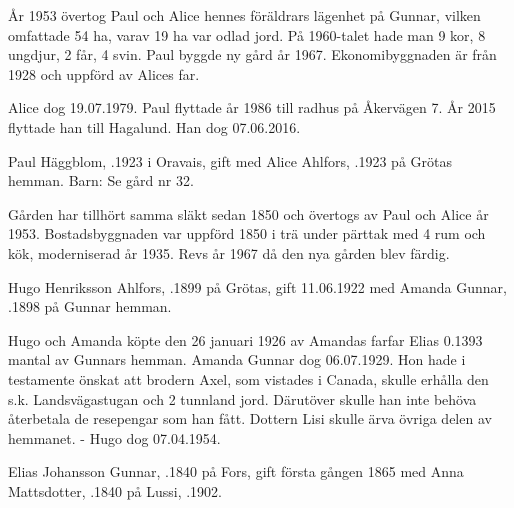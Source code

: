År 1953 övertog Paul och Alice hennes föräldrars lägenhet på Gunnar, vilken omfattade 54 ha, varav 19 ha var odlad jord. På 1960-talet hade man 9 kor, 8 ungdjur, 2 får, 4 svin. Paul byggde ny gård år 1967. Ekonomibyggnaden är från 1928 och uppförd av Alices far.

Alice dog 19.07.1979. Paul flyttade år 1986 till radhus på Åkervägen 7. År 2015 flyttade han till Hagalund. Han dog 07.06.2016.


%


%
Paul Häggblom, .1923 i Oravais, gift med Alice Ahlfors, .1923 på Grötas hemman. Barn: Se gård nr 32.

Gården har tillhört samma släkt sedan 1850 och övertogs av Paul och Alice år 1953. Bostadsbyggnaden var uppförd 1850 i trä under pärttak med 4 rum och kök, moderniserad år 1935. Revs år 1967 då den nya gården blev färdig.


%
Hugo Henriksson Ahlfors, .1899 på Grötas, gift 11.06.1922 med Amanda Gunnar, .1898 på Gunnar hemman.
\begin{jhchildren}
  \item {}
  \item {}
\end{jhchildren}

Hugo och Amanda köpte den 26 januari 1926 av Amandas farfar Elias 0.1393 mantal av Gunnars hemman. Amanda Gunnar dog 06.07.1929. Hon hade i testamente önskat att brodern Axel, som vistades i Canada, skulle erhålla den s.k. Landsvägastugan och 2 tunnland jord. Därutöver skulle han inte behöva återbetala de resepengar som han fått. Dottern Lisi skulle ärva övriga delen av hemmanet. - Hugo dog 07.04.1954.



%
Elias Johansson Gunnar, .1840 på Fors, gift första gången 1865 med Anna Mattsdotter, .1840 på Lussi, .1902.
\begin{jhchildren}
  \item {}
  \item {}
  \item {}
\end{jhchildren}

